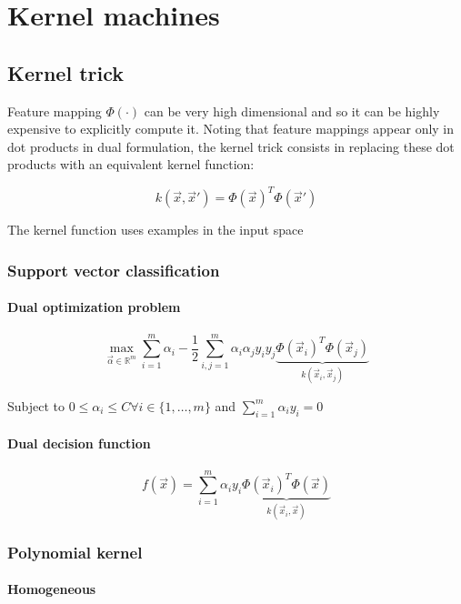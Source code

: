 \chapter{Kernel machines}

\section{Kernel trick}
Feature mapping $\Phi(\cdot)$ can be very high dimensional and so it can be highly expensive to explicitly compute it.
Noting that feature mappings appear only in dot products in dual formulation, the kernel trick consists in replacing these dot products with an equivalent kernel function:

$$k(\vec{x},\vec{x}') = \Phi(\vec{x})^T\Phi(\vec{x}')$$

The kernel function uses examples in the input space

	\subsection{Support vector classification}

		\subsubsection{Dual optimization problem}

		$$\max\limits_{\vec{\alpha}\in\mathbb{R}^m}\sum\limits_{i=1}^m\alpha_i-\frac{1}{2}\sum\limits_{i,j=1}^m\alpha_i\alpha_jy_iy_j\underbrace{\Phi(\vec{x}_i)^T\Phi(\vec{x}_j)}_{k(\vec{x}_i,\vec{x}_j)}$$

		Subject to $0\le\alpha_i\le C\forall i\in\{1,\dots,m\}$ and $\sum\limits_{i=1}^m\alpha_iy_i=0$

		\subsubsection{Dual decision function}

		$$f(\vec{x}) = \sum\limits_{i=1}^m\alpha_iy_i\underbrace{\Phi(\vec{x}_i)^T\Phi(\vec{x})}_{k(\vec{x}_i,\vec{x})}$$

	\subsection{Polynomial kernel}

		\subsubsection{Homogeneous}

